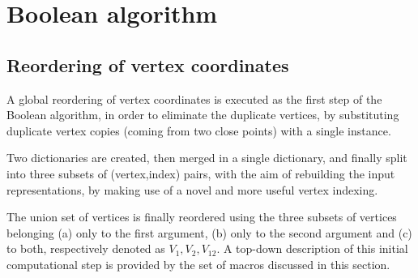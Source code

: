 \documentclass[11pt,oneside]{article}	%
\begin{document}
\section{Boolean algorithm}
\subsection{Reordering of vertex coordinates}
A global reordering of vertex coordinates is executed as the first step of the Boolean algorithm, in order to eliminate the duplicate vertices, by substituting duplicate vertex copies (coming from two close points) with a single instance. 

Two dictionaries are created, then merged in a single dictionary, and finally split into three subsets of (vertex,index) pairs, with the aim of rebuilding the input representations, by making use of a novel and more useful vertex indexing.

The union set of vertices is finally reordered using the three subsets of vertices belonging (a) only to the first argument, (b) only to the second argument and (c) to both, respectively denoted as $V_1, V_2, V_{12}$. A top-down description of this initial computational step is provided by the set of macros discussed in this section.
\end{document}
